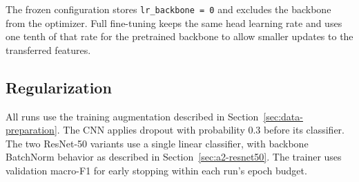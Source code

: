 The frozen configuration stores \texttt{lr\_backbone = 0} and excludes the backbone from the optimizer. Full fine-tuning keeps the same head learning rate and uses one tenth of that rate for the pretrained backbone to allow smaller updates to the transferred features.

\subsection{Regularization}

All runs use the training augmentation described in Section~\ref{sec:data-preparation}. The CNN applies dropout with probability 0.3 before its classifier. The two ResNet-50 variants use a single linear classifier, with backbone BatchNorm behavior as described in Section~\ref{sec:a2-resnet50}. The trainer uses validation macro-F1 for early stopping within each run's epoch budget.

\clearpage
